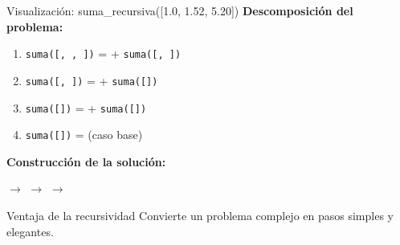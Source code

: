 \documentclass[10pt]{beamer}
\begin{document}
\begin{frame}{Visualización: suma\_recursiva([1.0, 1.52, 5.20])}
  \textbf{Descomposición del problema:}
  
  \begin{enumerate}
    \item \texttt{suma([, , ])} = 
           + \texttt{suma([, ])}
    
    \item \texttt{suma([, ])} = 
           + \texttt{suma([])}
    
    \item \texttt{suma([])} = 
           + \texttt{suma([])}
    
    \item \texttt{suma([])} =  (caso base)
  \end{enumerate}
  
  \vspace{0.3cm}
  \textbf{Construcción de la solución:}
  \begin{center}
     $\to$ 
     $\to$ 
     $\to$ 
  \end{center}
  
  \vspace{0.3cm}
  \begin{alertblock}{Ventaja de la recursividad}
    Convierte un problema complejo en pasos simples y elegantes.
  \end{alertblock}
\end{frame}

\end{document}
